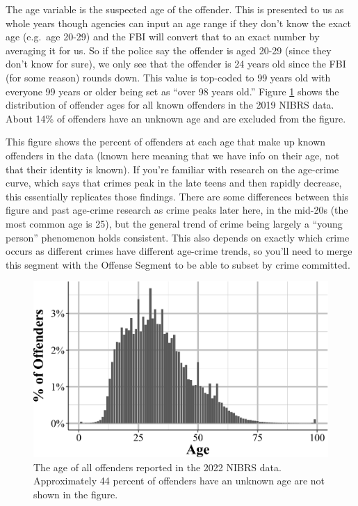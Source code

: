 \documentclass[
  12pt,
  openany]{book}
\begin{document}
The age variable is the suspected age of the offender. This is presented to us as whole years though agencies can input an age range if they don't know the exact age (e.g.~age 20-29) and the FBI will convert that to an exact number by averaging it for us. So if the police say the offender is aged 20-29 (since they don't know for sure), we only see that the offender is 24 years old since the FBI (for some reason) rounds down. This value is top-coded to 99 years old with everyone 99 years or older being set as ``over 98 years old.'' Figure \ref{fig:offenderAge} shows the distribution of offender ages for all known offenders in the 2019 NIBRS data. About 14\% of offenders have an unknown age and are excluded from the figure.

This figure shows the percent of offenders at each age that make up known offenders in the data (known here meaning that we have info on their age, not that their identity is known). If you're familiar with research on the age-crime curve, which says that crimes peak in the late teens and then rapidly decrease, this essentially replicates those findings. There are some differences between this figure and past age-crime research as crime peaks later here, in the mid-20s (the most common age is 25), but the general trend of crime being largely a ``young person'' phenomenon holds consistent. This also depends on exactly which crime occurs as different crimes have different age-crime trends, so you'll need to merge this segment with the Offense Segment to be able to subset by crime committed.

\begin{figure}

{\centering \includegraphics[width=0.9\linewidth]{14_nibrs_offender_files/figure-latex/offenderAge-1} 

}

\caption{The age of all offenders reported in the 2022 NIBRS data. Approximately 44 percent of offenders have an unknown age are not shown in the figure.}\label{fig:offenderAge}
\end{figure}
\end{document}
